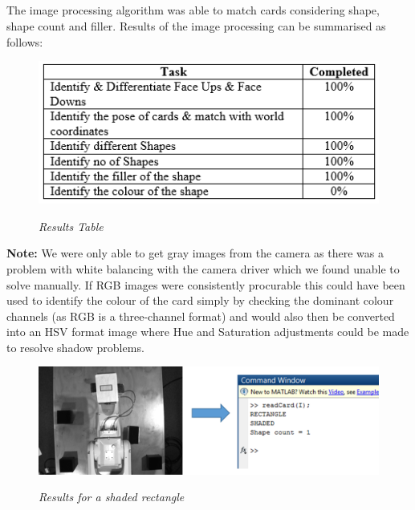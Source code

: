 \subsection*{}
The image processing algorithm was able to match cards considering shape, shape count and filler. Results of the image processing can be summarised as follows:
\begin{figure}[position = here]
	\begin{centering}
		\includegraphics[scale=0.8]{./sachiths_images/image7.png}\\
		\caption[]{\textit{Results Table}}
	\end{centering}
\end{figure}

\textbf{Note:} We were only able to get gray images from the camera as there was a problem with white balancing with the camera driver which we found unable to solve manually. If RGB images were consistently procurable this could have been used to identify the colour of the card simply by checking the dominant colour channels (as RGB is a three-channel format) and would also then be converted into an HSV format image where Hue and Saturation adjustments could be made to resolve shadow problems.

\begin{figure}[position = here]
	\begin{centering}
		\includegraphics[scale=0.5]{./sachiths_images/image9.png}\\
		\caption[]{\textit{Results for a shaded rectangle}}
	\end{centering}
\end{figure}


